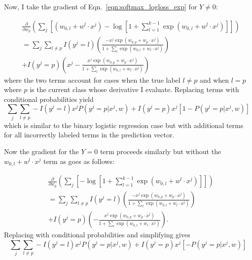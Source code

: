\documentclass[12pt]{amsart}
\begin{document}
Now, I take the gradient of Eqn.~\ref{eqn:softmax_logloss_exp} for $Y \neq 0$:

\begin{equation} \label{eqn:softmax_grad_neq}
\begin{split}
& \frac{\partial}{\partial w_p} \left( \sum_j \left[(w_{0,l} + w^l \cdot x^j) - \log[1 + \sum_{l= 1}^{k-1}\exp{(w_{0,l} + w^l \cdot x^j)}]\right] \right) \\
& = \sum_j  \sum_{l \neq p} I(y^j = l) \left( \frac{-x^j \exp(w_{0,p} + w_p \cdot x^j)}{1 + \sum_l \exp(w_{0,l} + w_l \cdot x^j)} \right)  \\
& + I(y^j = p) \left( x^j - \frac{x^j \exp(w_{0,p} + w_p \cdot x^j)}{1 + \sum_l \exp(w_{0,l} + w_l \cdot x^j)} \right)
\end{split}
\end{equation}
where the two terms account for cases when the true label $l \neq p$ and when $l = p$ where $p$ is the current class whose derivative I evaluate.  Replacing terms with conditional probabilities yield
\begin{equation}
\sum_j \sum_{l \neq p} -I(y^j = l) x^j P(y^j = p | x^j, w) + I(y^j = p) x^j \left[1 - P(y^j = p | x^j, w) \right]
\end{equation}
which is similar to the binary logistic regression case but with additional terms for all incorrectly labeled terms in the prediction vector.

Now the gradient for the $Y = 0$ term proceeds similarly but without the $w_{0,l} + w^l \cdot x^j$ term as goes as follows: 

\begin{equation} \label{eqn:softmax_grad_eq}
\begin{split}
& \frac{\partial}{\partial w_p} \left( \sum_j \left[- \log[1 + \sum_{l= 1}^{k-1}\exp{(w_{0,l} + w^l \cdot x^j)}]\right] \right) \\
& = \sum_j  \sum_{l \neq p} I(y^j = l) \left( \frac{-x^j \exp(w_{0,p} + w_p \cdot x^j)}{1 + \sum_l \exp(w_{0,l} + w_l \cdot x^j)} \right)  \\
& + I(y^j = p) \left( - \frac{x^j \exp(w_{0,p} + w_p \cdot x^j)}{1 + \sum_l \exp(w_{0,l} + w_l \cdot x^j)} \right).
\end{split}
\end{equation}
Replacing with conditional probabilities and simplifying gives
\begin{equation}
\sum_j \sum_{l \neq p} -I(y^j = l) x^j P(y^j = p | x^j, w) + I(y^j = p) x^j \left[- P(y^j = p | x^j, w) \right]
\end{equation}
\end{document}
